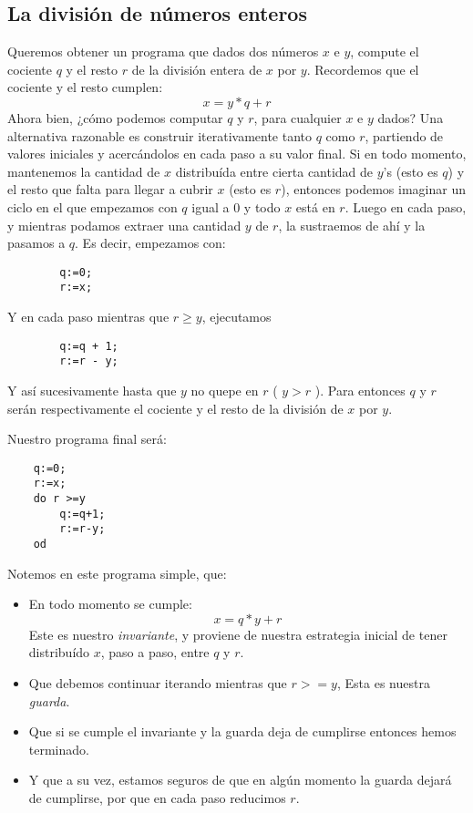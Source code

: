 \documentclass[11pt, a4paper, openany]{book}
\begin{document}
    \subsection{La división de números enteros}
    Queremos obtener un programa que dados dos números $x$ e $y$, compute el cociente $q$ y el resto $r$ de la división entera de $x$ por $y$.
    Recordemos que el cociente y el resto cumplen:
    $$x = y * q + r$$
    Ahora bien, ¿cómo podemos computar $q$ y $r$, para cualquier $x$ e $y$ dados?
    Una alternativa razonable es construir iterativamente tanto $q$ como $r$, partiendo de valores iniciales y acercándolos en cada paso a su valor final.
    Si en todo momento, mantenemos la cantidad de $x$ distribuída entre cierta cantidad de $y$’s (esto es $q$) y el resto que falta para llegar a cubrir $x$ (esto es $r$), entonces podemos imaginar un ciclo en el que empezamos con $q$ igual a 0 y todo $x$ está en $r$.
    Luego en cada paso, y mientras podamos extraer una cantidad $y$ de $r$, la sustraemos de ahí y la pasamos a $q$.
    Es decir, empezamos con:
    \begin{verbatim}
        q:=0;
        r:=x;
    \end{verbatim}
    Y en cada paso mientras que $r \geq y$, ejecutamos
    \begin{verbatim}
        q:=q + 1;
        r:=r - y;
    \end{verbatim}

    Y así sucesivamente hasta que $y$ no quepe en $r$ ( $ y > r $ ). Para entonces $q$ y $r$ serán respectivamente el cociente y el resto de la división de $x$ por $y$.

    Nuestro programa final será:
    \begin{verbatim}
    q:=0;
    r:=x;
    do r >=y
        q:=q+1;
        r:=r-y;
    od
    \end{verbatim}
    Notemos en este programa simple, que:
    \begin{itemize}
        \item En todo momento se cumple:
        $$x = q * y + r$$
        Este es nuestro \textit{invariante}, y proviene de nuestra estrategia inicial de tener distribuído $x$, paso a paso, entre $q$ y $r$.
        \item Que debemos continuar iterando mientras que $r >= y$,
        Esta es nuestra \textit{guarda}.
        \item Que si se cumple el invariante y la guarda deja de cumplirse entonces hemos terminado.
        \item Y que a su vez, estamos seguros de que en algún momento la guarda dejará de cumplirse, por que en cada paso reducimos $r$.
    \end{itemize}
\end{document}
